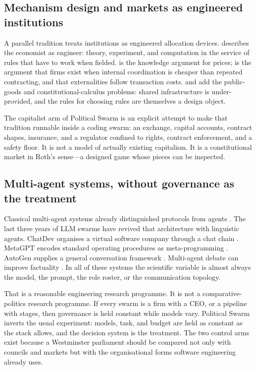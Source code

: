 \documentclass[11pt,a4paper]{article}
\begin{document}
\subsection{Mechanism design and markets as engineered institutions}

A parallel tradition treats institutions as engineered allocation devices.
\citet{roth2002} describes the economist as engineer: theory, experiment, and computation
in the service of rules that have to work when fielded. \citet{hayek1945} is the knowledge
argument for prices; \citet{coase1937,coase1960} is the argument that firms exist when
internal coordination is cheaper than repeated contracting, and that externalities follow
transaction costs. \citet{olson1965} and \citet{buchanan1962} add the public-goods and
constitutional-calculus problems: shared infrastructure is under-provided, and the rules
for choosing rules are themselves a design object.

The capitalist arm of Political Swarm is an explicit attempt to make that tradition
runnable inside a coding swarm: an exchange, capital accounts, contract shapes, insurance,
and a regulator confined to rights, contract enforcement, and a safety floor. It is not a
model of actually existing capitalism. It is a constitutional market in Roth's sense---a
designed game whose pieces can be inspected.

\subsection{Multi-agent systems, without governance as the treatment}

Classical multi-agent systems already distinguished protocols from agents
\citep{wooldridge2009}. The last three years of LLM swarms have revived that architecture
with linguistic agents. ChatDev organises a virtual software company through a chat chain
\citep{qian2024}. MetaGPT encodes standard operating procedures as meta-programming
\citep{hong2024}. AutoGen supplies a general conversation framework \citep{wu2023}.
Multi-agent debate can improve factuality \citep{du2024}. In all of these systems the
scientific variable is almost always the model, the prompt, the role roster, or the
communication topology.

That is a reasonable engineering research programme. It is not a comparative-politics
research programme. If every swarm is a firm with a CEO, or a pipeline with stages, then
governance is held constant while models vary. Political Swarm inverts the usual
experiment: models, task, and budget are held as constant as the stack allows, and the
decision system is the treatment. The two control arms exist because a Westminster
parliament should be compared not only with councils and markets but with the
organisational forms software engineering already uses.
\end{document}
